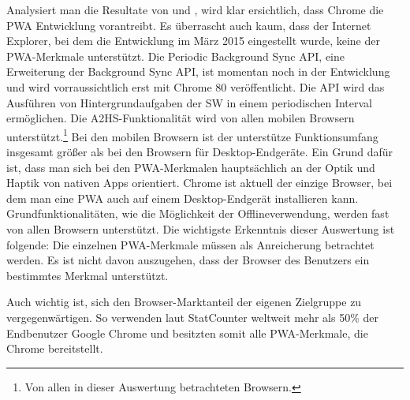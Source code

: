 Analysiert man die Resultate von  und
, wird klar ersichtlich, dass Chrome
die PWA Entwicklung vorantreibt. Es überrascht auch kaum, dass der Internet Explorer,
bei dem die Entwicklung im März 2015 eingestellt wurde, \cite{HeiseInternetExplorer} keine der PWA-Merkmale
unterstützt. Die Periodic Background Sync API, eine Erweiterung der Background
Sync API, ist momentan noch in der Entwicklung und wird vorraussichtlich erst mit
Chrome 80 veröffentlicht. Die API wird das Ausführen von Hintergrundaufgaben der SW
in einem periodischen Interval ermöglichen.\cite{ChromeStatusPeriodicBackgroundSync}
Die A2HS-Funktionalität wird von allen mobilen Browsern unterstützt.\footnote{Von allen in dieser Auswertung betrachteten Browsern.}
Bei den mobilen Browsern ist der unterstütze Funktionsumfang insgesamt größer als
bei den Browsern für Desktop-Endgeräte. Ein Grund dafür ist, dass man sich bei den PWA-Merkmalen
hauptsächlich an der Optik und Haptik von nativen Apps orientiert. Chrome ist aktuell
der einzige Browser, bei dem man eine PWA auch auf einem Desktop-Endgerät installieren
kann. Grundfunktionalitäten, wie  die Möglichkeit der Offlineverwendung, werden fast von allen
Browsern unterstützt. Die wichtigste Erkenntnis dieser Auswertung ist folgende: Die einzelnen
PWA-Merkmale müssen als Anreicherung betrachtet werden. Es ist nicht davon auszugehen, dass
der Browser des Benutzers ein bestimmtes Merkmal unterstützt.

Auch wichtig ist, sich den Browser-Marktanteil der eigenen Zielgruppe zu vergegenwärtigen.
So verwenden laut StatCounter weltweit mehr als 50\% der Endbenutzer Google Chrome und besitzten somit
alle PWA-Merkmale, die Chrome bereitstellt.\cite{StatCounterBrowserMarketShare}

